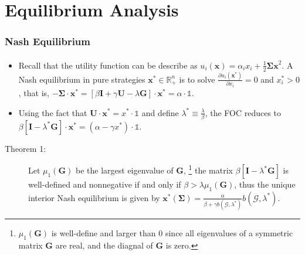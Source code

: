 \documentclass{beamer}
\newcommand{\ds}[1]{\mathds{#1}}
\newcommand{\eug}{\mathscr{G}}
\begin{document}
\section{Equilibrium Analysis}
\begin{frame}%
    \frametitle{Nash Equilibrium}
    \framesubtitle{}
    \begin{itemize}
        \item Recall that the utility function can be describe as 
            $u_i(\bm{x})=\alpha_ix_i+\frac{1}{2}\bm{\Sigma x}^2$. A Nash equilibrium in pure strategies 
            $\bm{x}^*\in\mathbb{R}^n_{+}$ is to solve 
            $\frac{\partial {u_i}(\bm{x}^*)}{\partial {x_i}}=0$ and $x_i^*>0$,
            that is, $-\bm{\Sigma}\cdot\bm{x}^*=[\beta\bm{I}+\gamma\bm{U}-\lambda\bm{G}]\cdot\bm{x}^*
            =\alpha\cdot\ds{1}$.
        \item Using the fact that $\bm{U}\cdot\bm{x}^*=x^*\cdot\ds{1}$ and define 
            $\lambda^*\equiv\frac{\lambda}{\beta}$, the FOC reduces to
            $\beta[\bm{I}-\lambda^*\bm{G}]\cdot\bm{x}^*=(\alpha-\gamma x^*)\cdot\ds{1}$.
    \end{itemize}
    \begin{description}
        \item[Theorem 1:] Let $\mu_1(\bm{G})$ be the largest eigenvalue of $\bm{G}$,
            \footnote{$\mu_1(\bm{G})$ is well-define and larger than $0$ since all eigenvalues
            of a symmetric matrix $\bm{G}$ are real, and the diagnal of $\bm{G}$ is zero.}
            the matrix $\beta[\bm{I}-\lambda^*\bm{G}]$ is well-defined and nonnegative
            if and only if $\beta>\lambda\mu_1(\bm{G})$, thus the unique interior Nash equilibrium
            is given by $\bm{x}^*(\bm{\Sigma})=\frac{\alpha}{\beta+\gamma b(\eug,\lambda^*)}
            b(\eug,\lambda^*)$.
    \end{description}
\end{frame}
\end{document}
